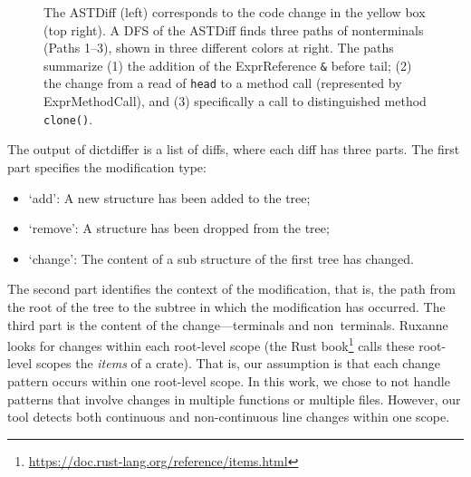 \begin{figure}[h]
    
    \caption{\label{fig:extraction}The ASTDiff (left) corresponds to the code change in the yellow box (top right). A DFS of the ASTDiff finds three paths of nonterminals (Paths 1--3), shown in three different colors at right. The paths summarize (1) the addition of the ExprReference {\tt \&} before tail; (2) the change from a read of \texttt{head} to a method call (represented by ExprMethodCall), and (3) specifically a call to distinguished method \texttt{clone()}.}

\end{figure}


The output of dictdiffer is a list of diffs, where each diff has three parts. The first part specifies the modification type:

\begin{itemize}
    \item `add': A new structure has been added to the tree; 
    \item `remove': A structure has been dropped from the tree; 
    \item `change': The content of a sub structure of the first tree has changed.
\end{itemize}

The second part identifies the context of the modification, that is, the path from the root of the tree to the subtree in which the modification has occurred. The third part is the content of the change---terminals and non~terminals. Ruxanne looks for changes within each root-level scope (the Rust book\footnote{\url{https://doc.rust-lang.org/reference/items.html}} calls these root-level scopes the \textit{items} of a crate). That is, our assumption is that each change pattern occurs within one root-level scope. In this work, we chose to not handle patterns that involve changes in multiple functions or multiple files. However, our tool detects both continuous and non-continuous line changes within one scope.

